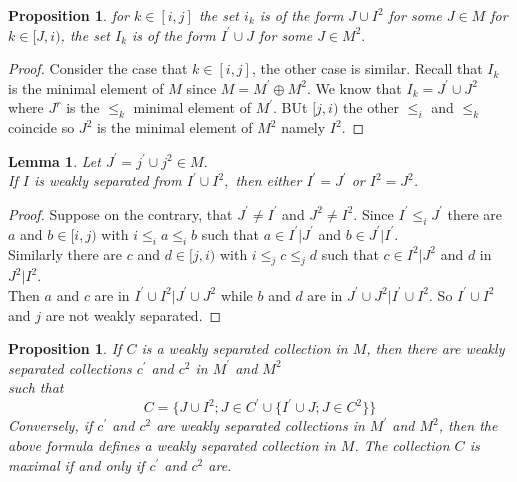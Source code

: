 \documentclass[12pt]{report}
\theoremstyle{theorem}
\newtheorem{lemma}[theorem]{Lemma}
\newtheorem{proposition}[theorem]{Proposition}
\begin{document}
\begin{proposition}
for $k\in [i,j]$ the set $i_k$ is of the form $J\cup I^2$ for some $J\in M$ for $k\in[J,i)$, the set $I_k$ is of the form $I^\prime\cup J$ for some $J\in M^2.$
\end{proposition}
\begin{proof}
Consider the case that $k\in[i,j]$, the other case is similar. Recall that $I_k$ is the minimal element of $M$ since $M = M^\prime\oplus M^2$. We know that $I_k = J^\prime\cup J^2$ where $J^r$ is the $\leq_k$ minimal element of $M^\prime.$ BUt $[j,i)$ the other $\leq_i$ and $\leq_k$ coincide so $J^2$ is the minimal element of $M^2$ namely $I^2.$
\end{proof}

\begin{lemma}
Let $J^\prime = j^\prime\cup j^2\in M$.\\
If $I$ is weakly separated from $I^\prime\cup I^2,$ then either $I^\prime = J^\prime$ or $I^2 = J^2$.
\end{lemma}

\begin{proof}
Suppose on the contrary, that $J^\prime\neq I^\prime$ and $J^2\neq I^2$. Since $I^\prime \leq_i J^\prime$ there are $a$ and $b\in [i,j)$ with $i\leq_i a\leq_i b$ such that $a\in I^\prime|J^\prime$ and $b\in J^\prime|I^\prime$.\\
Similarly there are $c$ and $d\in [j,i)$ with $i\leq_j c\leq_j d$ such that $c\in I^2| J^2$ and $d$ in $J^2|I^2$.\\
Then $a$ and $c$ are in $I^\prime\cup I^2|J^\prime\cup J^2$ while $b$ and $d$ are in $J^\prime\cup J^2|I^\prime\cup I^2.$ So $I^\prime\cup I^2$ and $j$ are not weakly separated.
\end{proof}

\begin{proposition}
If $C$ is a weakly separated collection in $M$, then there are weakly separated collections $c^\prime$ and $c^2$ in $M^\prime$ and $M^2$\\
such that\\
$$
C = \{J\cup I^2; J\in C^\prime\cup\{I^\prime\cup J; J\in C^2\}\}
$$
Conversely, if $c^\prime$ and $c^2$ are weakly separated collections in $	M^\prime$ and $M^2$, then the above formula defines a weakly separated collection in  $M$. The collection $C$ is maximal if and only if $c^\prime$ and $c^2$ are.
\end{proposition}
\end{document}
